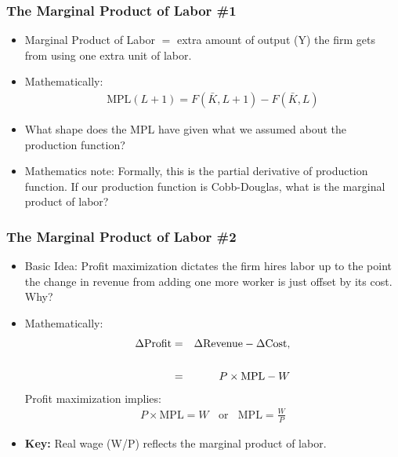 \documentclass[handout]{beamer}
\begin{document}

\begin{frame}[t]
\frametitle{The Marginal Product of Labor \#1}
\begin{itemize}
\item Marginal Product of Labor $=$ extra amount of output (Y) the firm gets from using one extra unit of labor.
\bigskip
\item Mathematically:
\begin{eqnarray*}
\mbox{MPL}(L+1) = F(\bar K,L+1) - F(\bar K,L)
\end{eqnarray*}
\bigskip
\item What shape does the MPL have given what we assumed about the production function?
\bigskip
\medskip
\item \small Mathematics note: Formally, this is the partial derivative of production function. If our production function is Cobb-Douglas, what is the marginal product of labor?
\end{itemize}
\end{frame}


\begin{frame}[t]
\frametitle{The Marginal Product of Labor \#2}
\begin{itemize}
\item Basic Idea: Profit maximization dictates the firm hires labor up to the point the change in revenue from adding one more worker is just offset by its cost. Why?
\bigskip
\item Mathematically:
\begin{eqnarray*}
\Delta \mbox{Profit} &=& \Delta \mbox{Revenue} - \Delta \mbox{Cost}, \\
\\
\normalsize &=& P \times \mbox{MPL} - W
\end{eqnarray*}
Profit maximization implies:
\begin{eqnarray*}
P \times \mbox{MPL} = W \ \ \ \ \mbox{or} \ \ \ \ \mbox{MPL} = \frac{W}{P}
\end{eqnarray*}
\medskip
\item \textbf{Key:} Real wage (W/P) reflects the marginal product of labor.
\end{itemize}
\end{frame}
\end{document}
